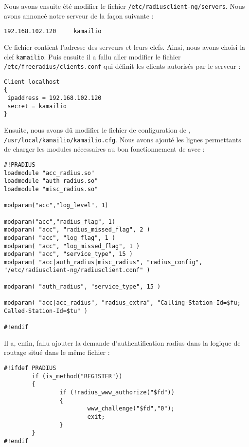 Nous avons ensuite été modifier le fichier \texttt{/etc/radiusclient-ng/servers}. Nous avons annoncé notre serveur de la façon suivante :

\begin{verbatim}
192.168.102.120		kamailio
\end{verbatim}

Ce fichier contient l'adresse des serveurs {\rad} et leurs clefs. Ainsi, nous avons choisi la clef \texttt{kamailio}.
Puis ensuite il a fallu aller modifier le fichier \texttt{/etc/freeradius/clients.conf} qui définit les clients autorisés par le serveur {\frad} :

\begin{verbatim}
Client localhost
{
 ipaddress = 192.168.102.120
 secret = kamailio
}
\end{verbatim}

Ensuite, nous avons dû modifier le fichier de configuration de {\kam}, \texttt{/usr/local/kamailio/kamailio.cfg}. Nous avons ajouté les lignes permettants de charger les modules nécessaires au bon fonctionnement de {\kam} avec {\frad} :
\begin{small}
\begin{verbatim}
#!PRADIUS
loadmodule "acc_radius.so"
loadmodule "auth_radius.so"
loadmodule "misc_radius.so"

modparam("acc","log_level", 1)

modparam("acc","radius_flag", 1)
modparam( "acc", "radius_missed_flag", 2 )
modparam( "acc", "log_flag", 1 )
modparam( "acc", "log_missed_flag", 1 )
modparam( "acc", "service_type", 15 )
modparam( "acc|auth_radius|misc_radius", "radius_config", "/etc/radiusclient-ng/radiusclient.conf" )

modparam( "auth_radius", "service_type", 15 )

modparam( "acc|acc_radius", "radius_extra", "Calling-Station-Id=$fu; Called-Station-Id=$tu" )

#!endif
\end{verbatim}
\end{small}

Il a, enfin, fallu ajouter la demande d'authentification radius dans la logique de routage situé dans le même fichier :

\begin{verbatim}
#!ifdef PRADIUS
        if (is_method("REGISTER"))
        {
                if (!radius_www_authorize("$fd"))
                {
                        www_challenge("$fd","0");
                        exit;
                }
        }
#!endif
\end{verbatim}



